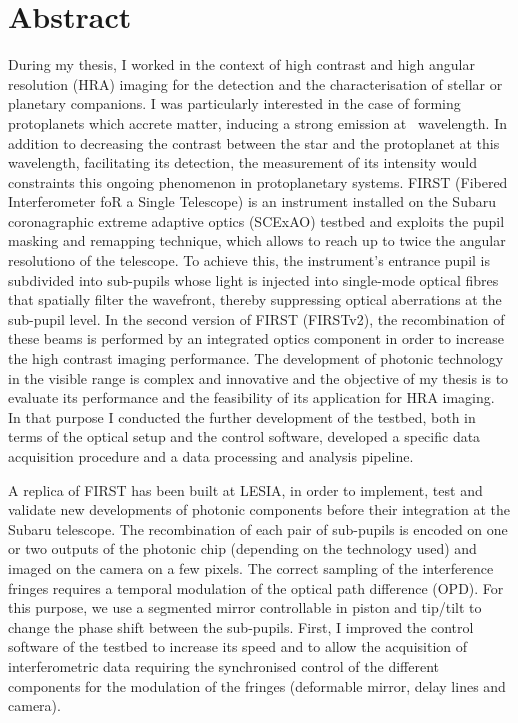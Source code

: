 
\newpage
\thispagestyle{empty}
\chapter*{Abstract}

During my thesis, I worked in the context of high contrast and high angular resolution (HRA) imaging for the detection and the characterisation of stellar or planetary companions. I was particularly interested in the case of forming protoplanets which accrete matter, inducing a strong emission at \ha~wavelength. In addition to decreasing the contrast between the star and the protoplanet at this wavelength, facilitating its detection, the measurement of its intensity would constraints this ongoing phenomenon in protoplanetary systems. FIRST (Fibered Interferometer foR a Single Telescope) is an instrument installed on the Subaru coronagraphic extreme adaptive optics (SCExAO) testbed and exploits the pupil masking and remapping technique, which allows to reach up to twice the angular resolutiono of the telescope. To achieve this, the instrument's entrance pupil is subdivided into sub-pupils whose light is injected into single-mode optical fibres that spatially filter the wavefront, thereby suppressing optical aberrations at the sub-pupil level. In the second version of FIRST (FIRSTv2), the recombination of these beams is performed by an integrated optics component in order to increase the high contrast imaging performance. The development of photonic technology in the visible range is complex and innovative and the objective of my thesis is to evaluate its performance and the feasibility of its application for HRA imaging. In that purpose I conducted the further development of the testbed, both in terms of the optical setup and the control software, developed a specific data acquisition procedure and a data processing and analysis pipeline.

A replica of FIRST has been built at LESIA, in order to implement, test and validate new developments of photonic components before their integration at the Subaru telescope. The recombination of each pair of sub-pupils is encoded on one or two outputs of the photonic chip (depending on the technology used) and imaged on the camera on a few pixels. The correct sampling of the interference fringes requires a temporal modulation of the optical path difference (OPD). For this purpose, we use a segmented mirror controllable in piston and tip/tilt to change the phase shift between the sub-pupils. First, I improved the control software of the testbed to increase its speed and to allow the acquisition of interferometric data requiring the synchronised control of the different components for the modulation of the fringes (deformable mirror, delay lines and camera).

